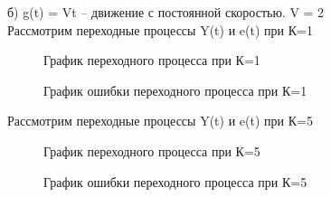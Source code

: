 \documentclass[a4paper, 11pt]{article}
\begin{document}
б) g(t) = Vt – движение с постоянной скоростью. V = 2\\

Рассмотрим переходные процессы Y(t) и e(t) при К=1

\begin{figure}[h!]
    \caption{График переходного процесса при К=1}
    \label{four}
\end{figure}

\begin{figure}[h!]
    \caption{График ошибки переходного процесса при К=1}
    \label{tree}
\end{figure}

\newpage

Рассмотрим переходные процессы Y(t) и e(t) при К=5

\begin{figure}[h!]
    \caption{График переходного процесса при К=5}
    \label{four}
\end{figure}

\begin{figure}[h!]
    \caption{График ошибки переходного процесса при К=5}
    \label{tree}
\end{figure}
\end{document}

